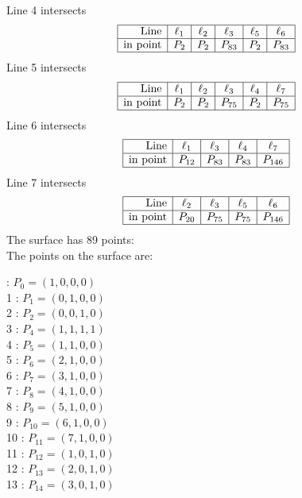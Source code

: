 \documentclass{article}
\begin{document}
{$$$$
Line 4 intersects 
$$
\begin{array}{|r*{5}{|c}|}
\hline
\mbox{Line}  & \ell_{1} & \ell_{2} & \ell_{3} & \ell_{5} & \ell_{6}\\
\hline
\mbox{in point}  & P_{2} & P_{2} & P_{83} & P_{2} & P_{83}\\
\hline
\end{array}
$$
Line 5 intersects 
$$
\begin{array}{|r*{5}{|c}|}
\hline
\mbox{Line}  & \ell_{1} & \ell_{2} & \ell_{3} & \ell_{4} & \ell_{7}\\
\hline
\mbox{in point}  & P_{2} & P_{2} & P_{75} & P_{2} & P_{75}\\
\hline
\end{array}
$$
Line 6 intersects 
$$
\begin{array}{|r*{4}{|c}|}
\hline
\mbox{Line}  & \ell_{1} & \ell_{3} & \ell_{4} & \ell_{7}\\
\hline
\mbox{in point}  & P_{12} & P_{83} & P_{83} & P_{146}\\
\hline
\end{array}
$$
Line 7 intersects 
$$
\begin{array}{|r*{4}{|c}|}
\hline
\mbox{Line}  & \ell_{2} & \ell_{3} & \ell_{5} & \ell_{6}\\
\hline
\mbox{in point}  & P_{20} & P_{75} & P_{75} & P_{146}\\
\hline
\end{array}
$$
The surface has 89 points:\\
The points on the surface are:\\
\begin{multicols}{3}
 : $P_{0}=( 1, 0, 0, 0 )$\\
1 : $P_{1}=( 0, 1, 0, 0 )$\\
2 : $P_{2}=( 0, 0, 1, 0 )$\\
3 : $P_{4}=( 1, 1, 1, 1 )$\\
4 : $P_{5}=( 1, 1, 0, 0 )$\\
5 : $P_{6}=( 2, 1, 0, 0 )$\\
6 : $P_{7}=( 3, 1, 0, 0 )$\\
7 : $P_{8}=( 4, 1, 0, 0 )$\\
8 : $P_{9}=( 5, 1, 0, 0 )$\\
9 : $P_{10}=( 6, 1, 0, 0 )$\\
10 : $P_{11}=( 7, 1, 0, 0 )$\\
11 : $P_{12}=( 1, 0, 1, 0 )$\\
12 : $P_{13}=( 2, 0, 1, 0 )$\\
13 : $P_{14}=( 3, 0, 1, 0 )$\\

\end{multicols}}
\end{document}
